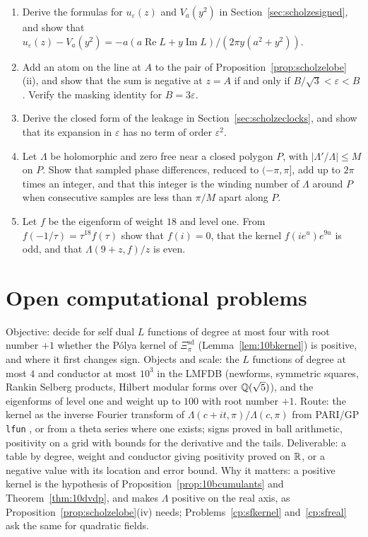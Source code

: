 \begin{enumerate}
\item Derive the formulas for $u_\varepsilon(z)$ and $V_a(y^2)$ in Section~\ref{sec:scholzesigned}, and show that $u_\varepsilon(z)-V_a(y^2)=-a(a\operatorname{Re}L+y\operatorname{Im}L)/(2\pi y(a^2+y^2))$.
\item Add an atom on the line at $A$ to the pair of Proposition~\ref{prop:scholzelobe}(ii), and show that the sum is negative at $z=A$ if and only if $B/\sqrt3<\varepsilon<B$. Verify the masking identity for $B=3\varepsilon$.
\item Derive the closed form of the leakage in Section~\ref{sec:scholzeclocks}, and show that its expansion in $\varepsilon$ has no term of order $\varepsilon^2$.
\item Let $\Lambda$ be holomorphic and zero free near a closed polygon $P$, with $|\Lambda'/\Lambda|\le M$ on $P$. Show that sampled phase differences, reduced to $(-\pi,\pi]$, add up to $2\pi$ times an integer, and that this integer is the winding number of $\Lambda$ around $P$ when consecutive samples are less than $\pi/M$ apart along $P$.
\item Let $f$ be the eigenform of weight $18$ and level one. From $f(-1/\tau)=\tau^{18}f(\tau)$ show that $f(i)=0$, that the kernel $f(ie^u)e^{9u}$ is odd, and that $\Lambda(9+z,f)/z$ is even.
\end{enumerate}

\section{Open computational problems}

\begin{compproblem}\label{cp:scholzekernel}
Objective: decide for self dual $L$ functions of degree at most four with root number $+1$ whether the P\'olya kernel of $\Xi^{\mathrm{sd}}_\pi$ (Lemma~\ref{lem:10bkernel}) is positive, and where it first changes sign. Objects and scale: the $L$ functions of degree at most $4$ and conductor at most $10^3$ in the LMFDB \cite{lmfdb} (newforms, symmetric squares, Rankin Selberg products, Hilbert modular forms over $\mathbb{Q}(\sqrt5)$), and the eigenforms of level one and weight up to $100$ with root number $+1$. Route: the kernel as the inverse Fourier transform of $\Lambda(c+it,\pi)/\Lambda(c,\pi)$ from PARI/GP \texttt{lfun} \cite{pari2023}, or from a theta series where one exists; signs proved in ball arithmetic, positivity on a grid with bounds for the derivative and the tails. Deliverable: a table by degree, weight and conductor giving positivity proved on $\mathbb{R}$, or a negative value with its location and error bound. Why it matters: a positive kernel is the hypothesis of Proposition~\ref{prop:10bcumulants} and Theorem~\ref{thm:10dvdp}, and makes $\Lambda$ positive on the real axis, as Proposition~\ref{prop:scholzelobe}(iv) needs; Problems~\ref{cp:sfkernel} and~\ref{cp:sfreal} ask the same for quadratic fields.
\end{compproblem}

